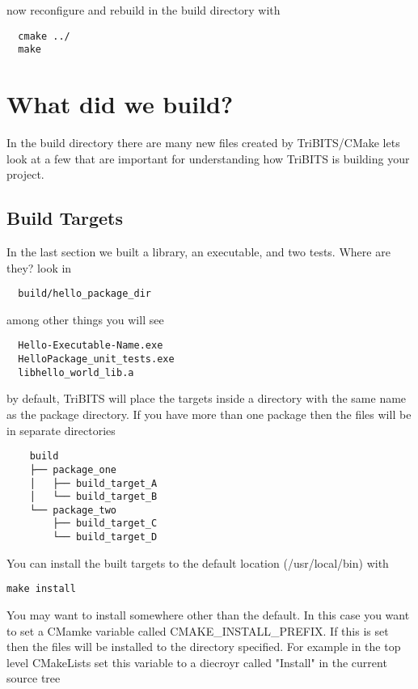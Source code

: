 \documentclass[12pt]{article}
\begin{document}
now reconfigure and rebuild in the build directory with

\begin{verbatim}
  cmake ../
  make
\end{verbatim}

\section{What did we build?}

In the build directory there are many new files created by
TriBITS/CMake lets look at a few that are important for understanding
how TriBITS is building your project.

\subsection{Build Targets}

In the last section we built a library, an executable, and two tests.
Where are they? look in

\begin{verbatim}
  build/hello_package_dir
\end{verbatim}

among other things you will see
  
\begin{verbatim}
  Hello-Executable-Name.exe
  HelloPackage_unit_tests.exe
  libhello_world_lib.a
\end{verbatim}

by default, TriBITS will place the targets inside a directory with the
same name as the package directory.  If you have more than one package
then the files will be in separate directories

\begin{verbatim}
    build
    ├── package_one
    │   ├── build_target_A
    │   └── build_target_B
    └── package_two
        ├── build_target_C
        └── build_target_D
\end{verbatim}

You can install the built targets to the default location
(/usr/local/bin) with

\begin{verbatim}
make install
\end{verbatim}

You may want to install somewhere other than the default.  In this
case you want to set a CMamke variable called CMAKE\_INSTALL\_PREFIX. If
this is set then the files will be installed to the directory
specified.  For example in the top level CMakeLists set this variable
to a diecroyr called "Install" in the current source tree
\end{document}

